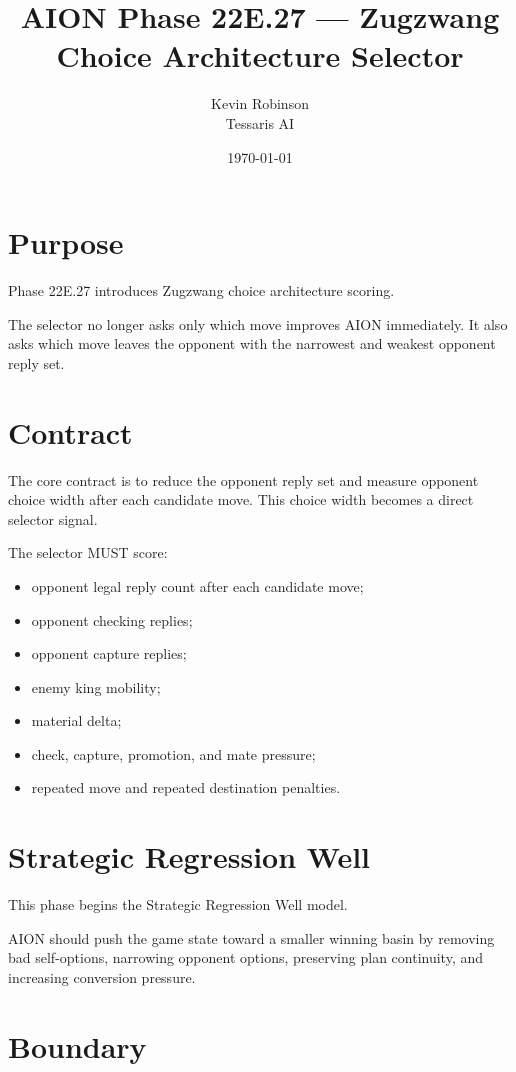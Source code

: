 \documentclass[11pt,a4paper]{article}
\title{\textbf{AION Phase 22E.27 --- Zugzwang Choice Architecture Selector}}
\author{Kevin Robinson\\Tessaris AI}
\date{\today}
\begin{document}
\maketitle

\section{Purpose}

Phase 22E.27 introduces Zugzwang choice architecture scoring.

The selector no longer asks only which move improves AION immediately. It also asks which move leaves the opponent with the narrowest and weakest opponent reply set.

\section{Contract}

The core contract is to reduce the opponent reply set and measure opponent choice width after each candidate move. This choice width becomes a direct selector signal.


The selector MUST score:

\begin{itemize}[leftmargin=*]
  \item opponent legal reply count after each candidate move;
  \item opponent checking replies;
  \item opponent capture replies;
  \item enemy king mobility;
  \item material delta;
  \item check, capture, promotion, and mate pressure;
  \item repeated move and repeated destination penalties.
\end{itemize}

\section{Strategic Regression Well}

This phase begins the Strategic Regression Well model.

AION should push the game state toward a smaller winning basin by removing bad self-options, narrowing opponent options, preserving plan continuity, and increasing conversion pressure.

\section{Boundary}
\end{document}
